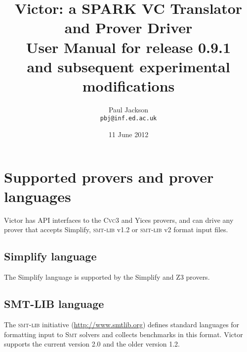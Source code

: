 \documentclass[12pt,fleqn]{article}
\title{Victor: a SPARK VC Translator and Prover Driver \\[4ex]
  \Large
  User Manual for release 0.9.1 \\
  and subsequent experimental modifications \\[1ex]
}
\author{Paul Jackson \\
        \texttt{pbj@inf.ed.ac.uk}}
\date{11 June 2012}
\newcommand{\cvcthree}{\textsc{Cvc}3}
\newcommand{\zthree}{\textsc{Z}3}
\newcommand{\yices}{Yices}
\newcommand{\smt}{\textsc{Smt}}
\newcommand{\smtlib}{\textsc{smt-lib}}
\begin{document}
\maketitle


\tableofcontents


\setlength{\parskip}{0.8\baselineskip}


\section{Supported provers and prover languages}

Victor has API interfaces to the \cvcthree{} and \yices{} provers, and
can drive any prover that accepts Simplify, \smtlib{} v1.2 or
\smtlib{} v2 format input files.

\subsection{Simplify language}

The Simplify language is supported by the Simplify and \zthree{} provers.

\subsection{SMT-LIB language}

The \smtlib{} initiative (\url{http://www.smtlib.org}) defines
standard languages for formatting input to \smt{} solvers and collects
benchmarks in this format. Victor supports the current version 2.0
and the older version 1.2.
\end{document}
